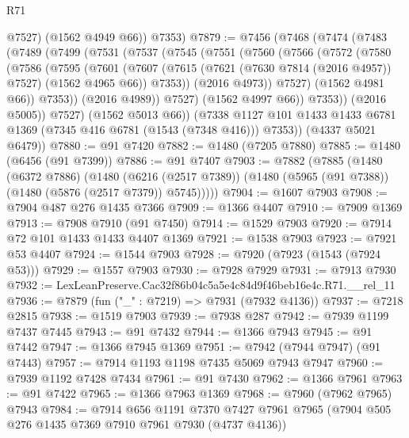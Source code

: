 \begin{lexlean}{R71}
\begin{coremodule}
          @7527)
        (@1562 @4949 @66))
      @7353)
@7879 := @7456
    (@7468
      (@7474
        (@7483
          (@7489
            (@7499
              (@7531
                (@7537
                  (@7545
                    (@7551
                      (@7560
                        (@7566
                          (@7572
                            (@7580
                              (@7586
                                (@7595
                                  (@7601
                                    (@7607
                                      (@7615
                                        (@7621 (@7630 @7814 (@2016 @4957)) @7527)
                                        (@1562 @4965 @66))
                                      @7353))
                                  (@2016 @4973))
                                @7527)
                              (@1562 @4981 @66))
                            @7353))
                        (@2016 @4989))
                      @7527)
                    (@1562 @4997 @66))
                  @7353))
              (@2016 @5005))
            @7527)
          (@1562 @5013 @66))
        (@7338 @1127 @101 @1433 @1433 @6781 @1369 (@7345 @416 @6781 (@1543 (@7348 @416))) @7353))
      (@4337 @5021 @6479))
@7880 := @91 @7420
@7882 := @1480 (@7205 @7880)
@7885 := @1480 (@6456 (@91 @7399))
@7886 := @91 @7407
@7903 := @7882
    (@7885
      (@1480
        (@6372 @7886)
        (@1480
          (@6216 (@2517 @7389))
          (@1480 (@5965 (@91 @7388)) (@1480 (@5876 (@2517 @7379)) @5745)))))
@7904 := @1607 @7903
@7908 := @7904 @487 @276 @1435 @7366
@7909 := @1366 @4407
@7910 := @7909 @1369
@7913 := @7908 @7910 (@91 @7450)
@7914 := @1529 @7903
@7920 := @7914 @72 @101 @1433 @1433 @4407 @1369
@7921 := @1538 @7903
@7923 := @7921 @53 @4407
@7924 := @1544 @7903
@7928 := @7920 (@7923 (@1543 (@7924 @53)))
@7929 := @1557 @7903
@7930 := @7928 @7929
@7931 := @7913 @7930
@7932 := LexLeanPreserve.Cac32f86b04c5a5e4c84d9f46beb16e4c.R71.__rel_11
@7936 := @7879 (fun ("_" : @7219) => @7931 (@7932 @4136))
@7937 := @7218 @2815
@7938 := @1519 @7903
@7939 := @7938 @287
@7942 := @7939 @1199 @7437 @7445
@7943 := @91 @7432
@7944 := @1366 @7943
@7945 := @91 @7442
@7947 := @1366 @7945 @1369
@7951 := @7942 (@7944 @7947) (@91 @7443)
@7957 := @7914 @1193 @1198 @7435 @5069 @7943 @7947
@7960 := @7939 @1192 @7428 @7434
@7961 := @91 @7430
@7962 := @1366 @7961
@7963 := @91 @7422
@7965 := @1366 @7963 @1369
@7968 := @7960 (@7962 @7965) @7943
@7984 := @7914
    @656
    @1191
    @7370
    @7427
    @7961
    @7965
    (@7904 @505 @276 @1435 @7369 @7910 @7961 @7930 (@4737 @4136))

\end{coremodule}
\end{lexlean}
